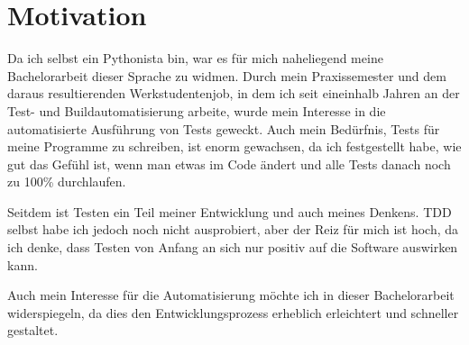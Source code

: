 \section{Motivation}
Da ich selbst ein \gls{Pythonista} bin, war es für mich naheliegend meine Bachelorarbeit
dieser Sprache zu widmen. Durch mein Praxissemester und dem daraus resultierenden
Werkstudentenjob, in dem ich seit eineinhalb Jahren an der Test- und Buildautomatisierung
arbeite, wurde mein Interesse in die automatisierte Ausführung von Tests geweckt. Auch mein
Bedürfnis, Tests für meine Programme zu schreiben, ist enorm gewachsen, da ich festgestellt
habe, wie gut das Gefühl ist, wenn man etwas im Code ändert und alle Tests danach noch
zu 100\% durchlaufen.

Seitdem ist Testen ein Teil meiner Entwicklung und auch meines Denkens. TDD selbst habe
ich jedoch noch nicht ausprobiert, aber der Reiz für mich ist hoch, da ich denke, dass
Testen von Anfang an sich nur positiv auf die Software auswirken kann.

Auch mein Interesse für die Automatisierung möchte ich in dieser Bachelorarbeit 
widerspiegeln, da dies den Entwicklungsprozess erheblich erleichtert und schneller
gestaltet.